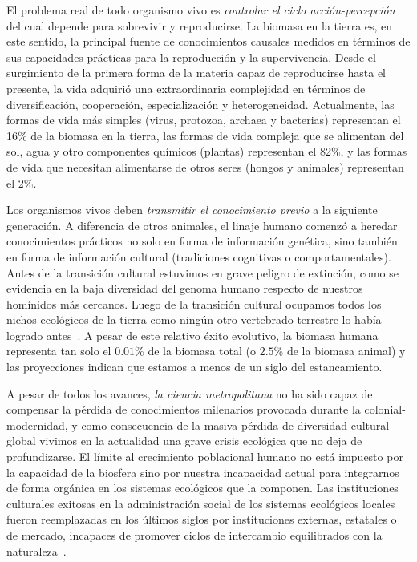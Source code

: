 \documentclass[11pt]{article}
\begin{document}
El problema real de todo organismo vivo es \emph{controlar el ciclo acción-percepción} del cual depende para sobrevivir y reproducirse.
La biomasa en la tierra es, en este sentido, la principal fuente de conocimientos causales medidos en términos de sus capacidades prácticas para la reproducción y la supervivencia.
Desde el surgimiento de la primera forma de la materia capaz de reproducirse hasta el presente, la vida adquirió una extraordinaria complejidad en términos de diversificación, cooperación, especialización y heterogeneidad.
Actualmente, las formas de vida más simples (virus, protozoa, archaea y bacterias) representan el 16\% de la biomasa en la tierra, las formas de vida compleja que se alimentan del sol, agua y otro componentes químicos (plantas) representan el 82\%, y las formas de vida que necesitan alimentarse de otros seres (hongos y animales) representan el 2\%.


Los organismos vivos deben \emph{transmitir el conocimiento previo} a la siguiente generación.
A diferencia de otros animales, el linaje humano comenzó a heredar conocimientos prácticos no solo en forma de información genética, sino también en forma de información cultural (tradiciones cognitivas o comportamentales).
Antes de la transición cultural estuvimos en grave peligro de extinción, como se evidencia en la baja diversidad del genoma humano respecto de nuestros homínidos más cercanos\cite{Hrdy2009}.
Luego de la transición cultural ocupamos todos los nichos ecológicos de la tierra como ningún otro vertebrado terrestre lo había logrado antes~\cite{Boyd2011}.
A pesar de este relativo éxito evolutivo, la biomasa humana representa tan solo el $0.01$\% de la biomasa total (o $2.5$\% de la biomasa animal) y las proyecciones indican que estamos a menos de un siglo del estancamiento.


A pesar de todos los avances, \emph{la ciencia metropolitana} no ha sido capaz de compensar la pérdida de conocimientos milenarios provocada durante la colonial-modernidad, y como consecuencia de la masiva pérdida de diversidad cultural global vivimos en la actualidad una grave crisis ecológica que no deja de profundizarse.
El límite al crecimiento poblacional humano no está impuesto por la capacidad de la biosfera sino por nuestra incapacidad actual para integrarnos de forma orgánica en los sistemas ecológicos que la componen.
Las instituciones culturales exitosas en la administración social de los sistemas ecológicos locales fueron reemplazadas en los últimos siglos por instituciones externas, estatales o de mercado, incapaces de promover ciclos de intercambio equilibrados con la naturaleza~\cite{ostrom2010, ostrom1990, segato2013-colonialidad}.
\end{document}
